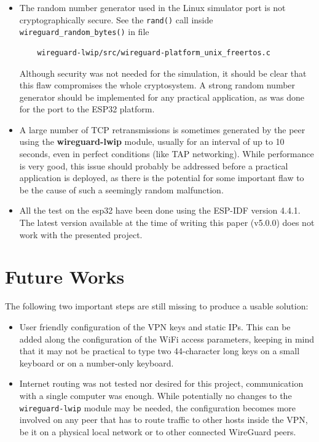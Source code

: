 \begin{itemize}
    \item The random number generator used in the Linux simulator port is not cryptographically secure. 
    See the \texttt{rand()} call inside \texttt{wireguard\_random\_bytes()} in file 
    \begin{lstlisting}
    wireguard-lwip/src/wireguard-platform_unix_freertos.c
    \end{lstlisting}
    Although security was not needed for the simulation, it should be clear that this flaw compromises the whole cryptosystem. A strong random number generator should be implemented for any practical application, as was done for the port to the ESP32 platform.
    
    \item A large number of TCP retransmissions is sometimes generated by the peer using the \textbf{wireguard-lwip} module, usually for an interval of up to 10 seconds, even in perfect conditions (like TAP networking). While performance is very good, this issue should probably be addressed before a practical application is deployed, as there is the potential for some important flaw to be the cause of such a seemingly random malfunction.
    \item All the test on the esp32 have been done using the ESP-IDF version 4.4.1. The latest version available at the time of writing this paper (v5.0.0) does not work with the presented project.
\end{itemize}

\section{Future Works}

The following two important steps are still missing to produce a usable solution:
\begin{itemize}
    \item User friendly configuration of the VPN keys and static IPs. This can be added along the configuration of the WiFi access parameters, keeping in mind that it may not be practical to type two 44-character long keys on a small keyboard or on a number-only keyboard.
    \item Internet routing was not tested nor desired for this project, communication with a single computer was enough. While potentially no changes to the \texttt{wireguard-lwip} module may be needed, the configuration becomes more involved on any peer that has to route traffic to other hosts inside the VPN, be it on a physical local network or to other connected WireGuard peers.
\end{itemize}


